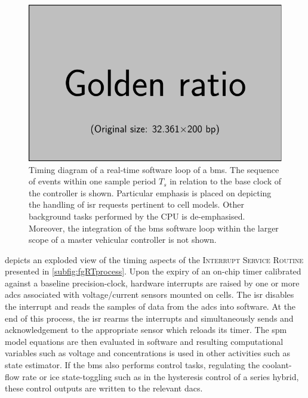 \begin{figure}[!htbp]
    \centering
    \includegraphics{placeholder_images/example-image-golden.pdf}
    \caption[Timing diagram of a real-time software loop of a ]
    {Timing diagram of a real-time software loop of a \gls{bms}. The sequence of
        events within one sample period $T_s$ in relation to the base clock of
        the controller is shown. Particular emphasis is placed on depicting the
        handling of \gls{isr} requests pertinent to cell models. Other
        background tasks performed by the CPU is de-emphasised. Moreover, the
        integration of the  \gls{bms} software loop within  the larger  scope of
    a master  vehicular controller is not shown.}
    \label{fig:timingdiagramBig}
\end{figure}

 depicts  an exploded view  of the timing  aspects of
the \textsc{Interrupt  Service Routine}  presented in \cref{subfig:fgRTprocess}.
Upon   the  expiry   of  an   on-chip  timer   calibrated  against   a  baseline
precision-clock,  hardware interrupts  are  raised by  one  or more  \glspl{adc}
associated with voltage/current sensors mounted on cells. The \gls{isr} disables
the  interrupt  and  reads  the  samples  of  data  from  the  \glspl{adc}  into
software. At  the end of this  process, the \gls{isr} rearms  the interrupts and
simultaneously sends and acknowledgement to the appropriate sensor which reloads
its timer.  The \gls{spm}  model equations  are then  evaluated in  software and
resulting computational variables such as  voltage and concentrations is used in
other activities such as state estimator. If the \gls{bms} also performs control
tasks, \eg{} regulating  the coolant-flow rate or  \gls{ice} state-toggling such
as  in the  hysteresis control  of a  series hybrid,  these control  outputs are
written to the relevant \glspl{dac}.

